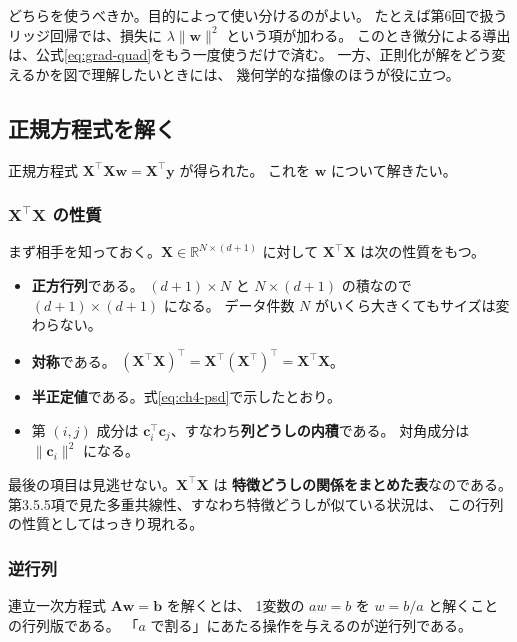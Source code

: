 どちらを使うべきか。目的によって使い分けるのがよい。
たとえば第6回で扱うリッジ回帰では、損失に $\lambda\|\bm{w}\|^2$ という項が加わる。
このとき微分による導出は、公式\eqref{eq:grad-quad}をもう一度使うだけで済む。
一方、正則化が解をどう変えるかを図で理解したいときには、
幾何学的な描像のほうが役に立つ。


\subsection{正規方程式を解く}

正規方程式 $\bm{X}^\top\bm{X}\bm{w} = \bm{X}^\top\bm{y}$ が得られた。
これを $\bm{w}$ について解きたい。

\subsubsection{\texorpdfstring{$\bm{X}^\top\bm{X}$}{X\^{}TX} の性質}

まず相手を知っておく。$\bm{X} \in \mathbb{R}^{N \times (d+1)}$ に対して
$\bm{X}^\top\bm{X}$ は次の性質をもつ。

\begin{itemize}
  \item \textbf{正方行列}である。
    $(d+1) \times N$ と $N \times (d+1)$ の積なので $(d+1) \times (d+1)$ になる。
    データ件数 $N$ がいくら大きくてもサイズは変わらない。
  \item \textbf{対称}である。
    $(\bm{X}^\top\bm{X})^\top = \bm{X}^\top (\bm{X}^\top)^\top = \bm{X}^\top\bm{X}$。
  \item \textbf{半正定値}である。式\eqref{eq:ch4-psd}で示したとおり。
  \item 第 $(i,j)$ 成分は $\bm{c}_i^\top\bm{c}_j$、すなわち\textbf{列どうしの内積}である。
    対角成分は $\|\bm{c}_i\|^2$ になる。
\end{itemize}

最後の項目は見逃せない。$\bm{X}^\top\bm{X}$ は
\textbf{特徴どうしの関係をまとめた表}なのである。
第3.5.5項で見た多重共線性、すなわち特徴どうしが似ている状況は、
この行列の性質としてはっきり現れる。

\subsubsection{逆行列}

連立一次方程式 $\bm{A}\bm{w} = \bm{b}$ を解くとは、
1変数の $aw = b$ を $w = b/a$ と解くことの行列版である。
「$a$ で割る」にあたる操作を与えるのが逆行列である。

